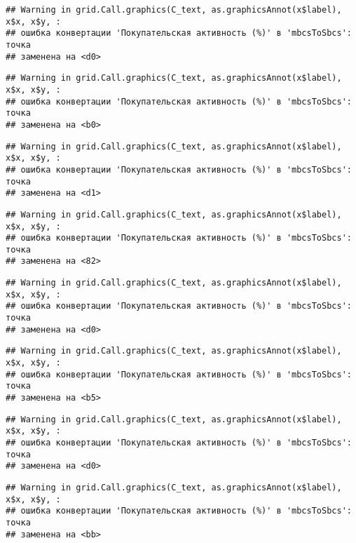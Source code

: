 \documentclass[
]{article}
\begin{document}
\begin{verbatim}
## Warning in grid.Call.graphics(C_text, as.graphicsAnnot(x$label), x$x, x$y, :
## ошибка конвертации 'Покупательская активность (%)' в 'mbcsToSbcs': точка
## заменена на <d0>
\end{verbatim}

\begin{verbatim}
## Warning in grid.Call.graphics(C_text, as.graphicsAnnot(x$label), x$x, x$y, :
## ошибка конвертации 'Покупательская активность (%)' в 'mbcsToSbcs': точка
## заменена на <b0>
\end{verbatim}

\begin{verbatim}
## Warning in grid.Call.graphics(C_text, as.graphicsAnnot(x$label), x$x, x$y, :
## ошибка конвертации 'Покупательская активность (%)' в 'mbcsToSbcs': точка
## заменена на <d1>
\end{verbatim}

\begin{verbatim}
## Warning in grid.Call.graphics(C_text, as.graphicsAnnot(x$label), x$x, x$y, :
## ошибка конвертации 'Покупательская активность (%)' в 'mbcsToSbcs': точка
## заменена на <82>
\end{verbatim}

\begin{verbatim}
## Warning in grid.Call.graphics(C_text, as.graphicsAnnot(x$label), x$x, x$y, :
## ошибка конвертации 'Покупательская активность (%)' в 'mbcsToSbcs': точка
## заменена на <d0>
\end{verbatim}

\begin{verbatim}
## Warning in grid.Call.graphics(C_text, as.graphicsAnnot(x$label), x$x, x$y, :
## ошибка конвертации 'Покупательская активность (%)' в 'mbcsToSbcs': точка
## заменена на <b5>
\end{verbatim}

\begin{verbatim}
## Warning in grid.Call.graphics(C_text, as.graphicsAnnot(x$label), x$x, x$y, :
## ошибка конвертации 'Покупательская активность (%)' в 'mbcsToSbcs': точка
## заменена на <d0>
\end{verbatim}

\begin{verbatim}
## Warning in grid.Call.graphics(C_text, as.graphicsAnnot(x$label), x$x, x$y, :
## ошибка конвертации 'Покупательская активность (%)' в 'mbcsToSbcs': точка
## заменена на <bb>
\end{verbatim}
\end{document}

